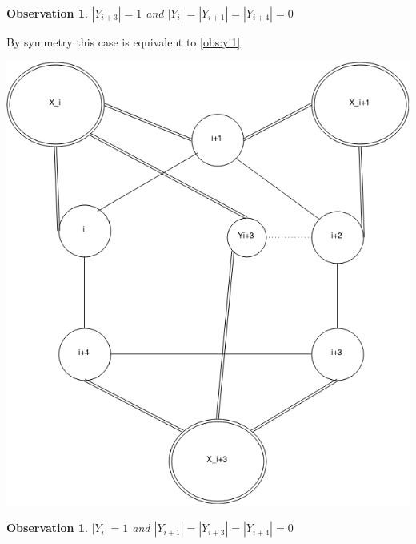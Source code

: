 \documentclass[12pt]{article}
\newtheorem{Observation}[Theorem]{Observation}
\begin{document}
\begin{Observation}\label{obs:yi3}
$|Y_{i+3}| = 1$ and $|Y_i| = |Y_{i+1}| = |Y_{i+4}| = 0$
\end{Observation}

\begin{minipage}{0.5\textwidth}%
	 By symmetry this case is equivalent to \ref{obs:yi1}.
\end{minipage}
\hfill
\begin{minipage}{0.5\textwidth}\raggedleft
	\includegraphics[width=\linewidth]{Yi3.png}
\end{minipage}



\begin{Observation}\label{obs:yi}
$|Y_{i}| = 1$ and $|Y_{i+1}| = |Y_{i+3}| = |Y_{i+4}| = 0$
\end{Observation}
\end{document}
